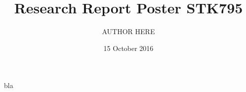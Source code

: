 \documentclass[10pt,english,final]{beamer}
\title{Research Report Poster STK795}
\author{AUTHOR HERE}
\institute{Department University}
\date{15 October 2016}
\begin{document}
\begin{frame}{}
bla
\end{frame}
\end{document}
